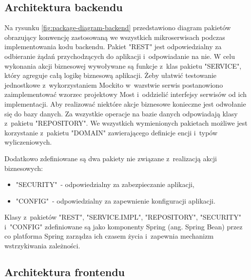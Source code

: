 
\subsection{Architektura backendu}\label{subsec:system-architecture:backend}


Na rysunku \ref{fig:package-diagram-backend} przedstawiono diagram pakietów obrazujący konwencję zastosowaną we wszystkich mikroserwisach podczas implementowania kodu backendu.
Pakiet "REST" jest odpowiedzialny za odbieranie żądań przychodzących do aplikacji i~odpowiadanie na nie.
W celu wykonania akcji biznesowej wywoływane są funkcje z~klas pakietu "SERVICE", który agreguje całą logikę biznesową aplikacji.
Żeby ułatwić testowanie jednostkowe z~wykorzystaniem Mockito w~warstwie serwis postanowiono zaimplementować wzorzec projektowy Most\cite{book:wzorce-projektowe} i~oddzielić interfejsy serwisów od ich implementacji.
Aby realizować niektóre akcje biznesowe konieczne jest odwołanie się do bazy danych.
Za wszystkie operacje na bazie danych odpowiadają klasy z~pakietu "REPOSITORY".
We wszystkich wymienionych pakietach możliwe jest korzystanie z~pakietu "DOMAIN" zawierającego definicje encji i~typów wyliczeniowych.

\par
Dodatkowo zdefiniowane są dwa pakiety nie związane z~realizacją akcji biznesowych:
\begin{itemize}
    \item "SECURITY"~- odpowiedzialny za zabezpieczanie aplikacji,
    \item "CONFIG"~- odpowiedzialny za zapewnienie konfiguracji aplikacji.
\end{itemize}

\par
Klasy z~pakietów "REST", "SERVICE.IMPL", "REPOSITORY", "SECURITY" i~"CONFIG" zdefiniowane są jako komponenty Spring (ang. Spring Bean) przez co platforma Spring zarządza ich czasem życia i~zapewnia mechanizm wstrzykiwania zależności\cite{book:spring-w-akcji}.

\subsection{Architektura frontendu}\label{subsec:system-architecture:frontend}

